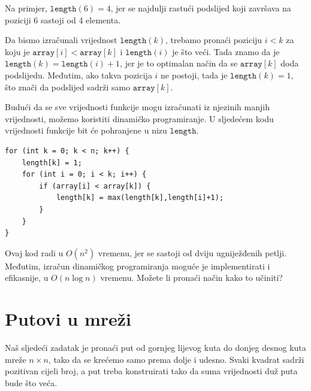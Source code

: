 Na primjer, $\texttt{length}(6)=4$,
jer se najdulji rastući podslijed
koji završava na poziciji 6 sastoji od 4 elementa.

Da bismo izračunali vrijednost $\texttt{length}(k)$,
trebamo pronaći poziciju $i<k$
za koju je $\texttt{array}[i]<\texttt{array}[k]$
i $\texttt{length}(i)$ je što veći.
Tada znamo da je
$\texttt{length}(k)=\texttt{length}(i)+1$,
jer je to optimalan način da se
$\texttt{array}[k]$ doda podslijedu.
Međutim, ako takva pozicija $i$ ne postoji,
tada je $\texttt{length}(k)=1$,
što znači da podslijed sadrži samo
$\texttt{array}[k]$.

Budući da se sve vrijednosti funkcije mogu izračunati
iz njezinih manjih vrijednosti,
možemo koristiti dinamičko programiranje.
U sljedećem kodu vrijednosti
funkcije bit će pohranjene u nizu
$\texttt{length}$.

\begin{lstlisting}
for (int k = 0; k < n; k++) {
    length[k] = 1;
    for (int i = 0; i < k; i++) {
        if (array[i] < array[k]) {
            length[k] = max(length[k],length[i]+1);
        }
    }
}
\end{lstlisting}

Ovaj kod radi u $O(n^2)$ vremenu,
jer se sastoji od dviju ugniježđenih petlji.
Međutim, izračun dinamičkog programiranja
moguće je implementirati
i efikasnije, u $O(n \log n)$ vremenu.
Možete li pronaći način kako to učiniti?

\section{Putovi u mreži}

Naš sljedeći zadatak je pronaći put
od gornjeg lijevog kuta do
donjeg desnog kuta
mreže $n \times n$, tako da se
krećemo samo prema dolje i udesno.
Svaki kvadrat sadrži pozitivan cijeli broj,
a put treba konstruirati tako
da suma vrijednosti duž
puta bude što veća.

